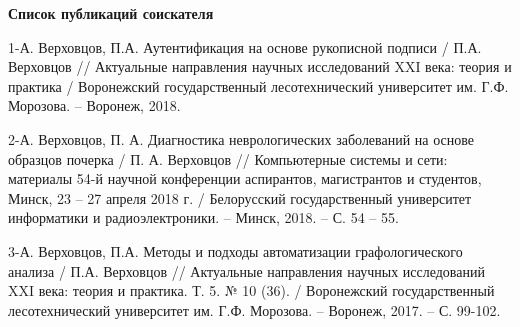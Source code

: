 \renewcommand{\bibsection}{\subsection*{Список использованных источников}}
\pagebreak%



\bigskip
{\large\bfseries Список публикаций соискателя}
\bigskip

1-А. Верховцов, П.А. Аутентификация на основе рукописной подписи / П.А. Верховцов // Актуальные направления научных исследований XXI века: теория и практика / Воронежский государственный лесотехнический университет им. Г.Ф. Морозова. – Воронеж, 2018.

2-А. Верховцов, П. А. Диагностика неврологических заболеваний на основе образцов почерка / П. А. Верховцов // Компьютерные системы и сети: материалы 54-й научной конференции аспирантов, магистрантов и студентов, Минск, 23 – 27 апреля 2018 г. / Белорусский государственный университет информатики и радиоэлектроники. – Минск, 2018. – С. 54 – 55.

3-А. Верховцов, П.А. Методы и подходы автоматизации графологического анализа / П.А. Верховцов // Актуальные направления научных исследований XXI века: теория и практика. Т. 5. № 10 (36). / Воронежский государственный лесотехнический университет им. Г.Ф. Морозова. – Воронеж, 2017. – С. 99-102.